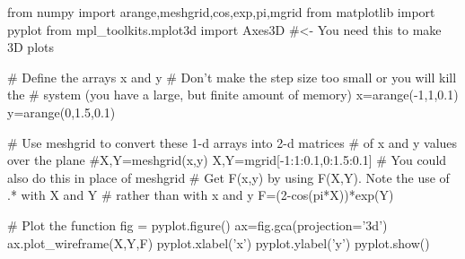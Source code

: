 \begin{codeexample}
\begin{VerbatimOut}{\listingFile}
from numpy import arange,meshgrid,cos,exp,pi,mgrid
from matplotlib import pyplot
from mpl_toolkits.mplot3d import Axes3D  #<- You need this to make 3D plots

# Define the arrays x and y
# Don't make the step size too small or you will kill the
# system (you have a large, but finite amount of memory)
x=arange(-1,1,0.1)
y=arange(0,1.5,0.1)

# Use meshgrid to convert these 1-d arrays into 2-d matrices
# of x and y values over the plane
#X,Y=meshgrid(x,y)
X,Y=mgrid[-1:1:0.1,0:1.5:0.1]  # You could also do this in place of meshgrid
# Get F(x,y) by using F(X,Y). Note the use of .* with X and Y
# rather than with x and y
F=(2-cos(pi*X))*exp(Y)

# Plot the function
fig = pyplot.figure()
ax=fig.gca(projection='3d')
ax.plot_wireframe(X,Y,F)
pyplot.xlabel('x')
pyplot.ylabel('y')
pyplot.show()
\end{VerbatimOut}
\end{codeexample}


%
%
%
%
%

